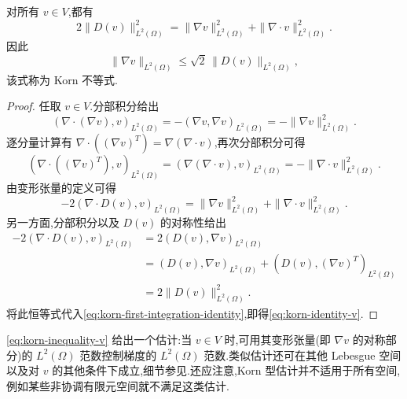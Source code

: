 \begin{lemma}\label{lem:korn-identity-v}
对所有 $v\in V$,都有
\begin{equation}\label{eq:korn-identity-v}
  2\|D(v)\|_{L^2(\Omega)}^2
    =\|\nabla v\|_{L^2(\Omega)}^2
      +\|\nabla\cdot v\|_{L^2(\Omega)}^2.
\end{equation}
因此
\begin{equation}\label{eq:korn-inequality-v}
  \|\nabla v\|_{L^2(\Omega)}
    \le\sqrt{2}\,\|D(v)\|_{L^2(\Omega)},
\end{equation}
该式称为 Korn 不等式.
\end{lemma}
\begin{proof}
任取 $v\in V$.分部积分给出
\[
  (\nabla\cdot(\nabla v),v)_{L^2(\Omega)}
    =-(\nabla v,\nabla v)_{L^2(\Omega)}
    =-\|\nabla v\|_{L^2(\Omega)}^2.
\]
逐分量计算有 $\nabla\cdot((\nabla v)^T)=\nabla(\nabla\cdot v)$,再次分部积分可得
\[
  (\nabla\cdot((\nabla v)^T),v)_{L^2(\Omega)}
    =(\nabla(\nabla\cdot v),v)_{L^2(\Omega)}
    =-\|\nabla\cdot v\|_{L^2(\Omega)}^2.
\]
由变形张量的定义可得
\begin{equation}\label{eq:korn-first-integration-identity}
  -2(\nabla\cdot D(v),v)_{L^2(\Omega)}
    =\|\nabla v\|_{L^2(\Omega)}^2
      +\|\nabla\cdot v\|_{L^2(\Omega)}^2.
\end{equation}
另一方面,分部积分以及 $D(v)$ 的对称性给出
\[
\begin{aligned}
  -2(\nabla\cdot D(v),v)_{L^2(\Omega)}
   &=2(D(v),\nabla v)_{L^2(\Omega)}\\
   &=(D(v),\nabla v)_{L^2(\Omega)}
      +(D(v),(\nabla v)^T)_{L^2(\Omega)}\\
   &=2\|D(v)\|_{L^2(\Omega)}^2.
\end{aligned}
\]
将此恒等式代入\cref{eq:korn-first-integration-identity},即得\cref{eq:korn-identity-v}.
\end{proof}

\begin{note}\label{note:about-korn-inequality}
\cref{eq:korn-inequality-v} 给出一个估计:当 $v\in V$ 时,可用其变形张量(即 $\nabla v$ 的对称部分)的 $L^2(\Omega)$ 范数控制梯度的 $L^2(\Omega)$ 范数.类似估计还可在其他 Lebesgue 空间以及对 $v$ 的其他条件下成立,细节参见\textcite{Friedrichs1947,Horgan1995}.还应注意,Korn 型估计并不适用于所有空间,例如某些非协调有限元空间就不满足这类估计.
\end{note}

